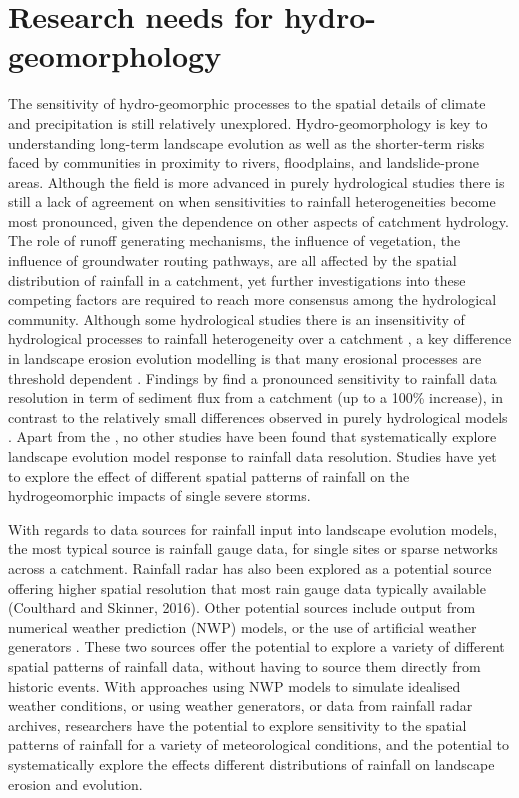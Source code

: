 \section{Research needs for hydro-geomorphology}

The sensitivity of hydro-geomorphic processes to the spatial details of climate and precipitation is still relatively unexplored. Hydro-geomorphology is key to understanding long-term landscape evolution as well as the shorter-term risks faced by communities in proximity to rivers, floodplains, and landslide-prone areas. Although the field is more advanced in purely hydrological studies \citep{krajewski1991monte,smith2005field,segond2007simulation,nicotina2008impact} there is still a lack of agreement on when sensitivities to rainfall heterogeneities become most pronounced, given the dependence on other aspects of catchment hydrology. The role of runoff generating mechanisms, the influence of vegetation, the influence of groundwater routing pathways, are all affected by the spatial distribution of rainfall in a catchment, yet further investigations into these competing factors are required to reach more consensus among the hydrological community. Although some hydrological studies there is an insensitivity of hydrological processes to rainfall heterogeneity over a catchment \citep{krajewski1991monte,smith2005field}, a key difference in landscape erosion evolution modelling is that many erosional processes are threshold dependent \citep{snyder2003importance}. Findings by \citet{coulthard2016sensitivity} find a pronounced sensitivity to rainfall data resolution in term of sediment flux from a catchment (up to a 100\% increase), in contrast to the relatively small differences observed in purely hydrological models \citep[e.g.][]{nicotina2008impact}. Apart from the \citet{coulthard2016sensitivity}, no other studies have been found that systematically explore landscape evolution model response to rainfall data resolution. Studies have yet to explore the effect of different spatial patterns of rainfall on the hydrogeomorphic impacts of single severe storms. 

With regards to data sources for rainfall input into landscape evolution models, the most typical source is rainfall gauge data, for single sites or sparse networks across a catchment. Rainfall radar has also been explored as a potential source offering higher spatial resolution that most rain gauge data typically available (Coulthard and Skinner, 2016). Other potential sources include output from numerical weather prediction (NWP) models, or the use of artificial weather generators \citep[e.g.][]{Peleg2014}. These two sources offer the potential to explore a variety of different spatial patterns of rainfall data, without having to source them directly from historic events. With approaches using NWP models to simulate idealised weather conditions, or using weather generators, or data from rainfall radar archives, researchers have the potential to explore sensitivity to the spatial patterns of rainfall for a variety of meteorological conditions, and the potential to systematically explore the effects different distributions of rainfall on landscape erosion and evolution. 

